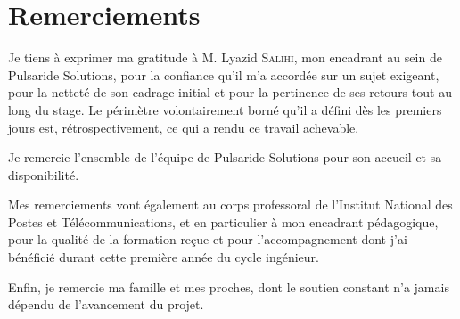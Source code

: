 \chapter*{Remerciements}

Je tiens à exprimer ma gratitude à M. Lyazid \textsc{Salihi}, mon encadrant au sein de
Pulsaride Solutions, pour la confiance qu'il m'a accordée sur un sujet exigeant, pour la
netteté de son cadrage initial et pour la pertinence de ses retours tout au long du stage.
Le périmètre volontairement borné qu'il a défini dès les premiers jours est, rétrospectivement,
ce qui a rendu ce travail achevable.

Je remercie l'ensemble de l'équipe de Pulsaride Solutions pour son accueil et sa
disponibilité.

Mes remerciements vont également au corps professoral de l'Institut National des Postes et
Télécommunications, et en particulier à mon encadrant pédagogique, pour la qualité de la
formation reçue et pour l'accompagnement dont j'ai bénéficié durant cette première année du
cycle ingénieur.

Enfin, je remercie ma famille et mes proches, dont le soutien constant n'a jamais dépendu de
l'avancement du projet.
